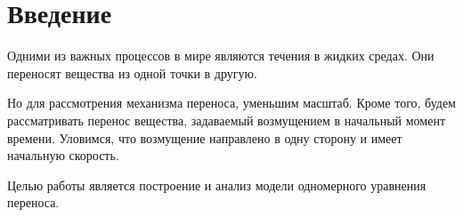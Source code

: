 \section{Введение}
Одними из важных процессов в мире являются течения в жидких средах. 
Они переносят вещества из одной точки в другую.

Но для рассмотрения механизма переноса, уменьшим масштаб.
Кроме того, будем рассматривать перенос вещества, задаваемый возмущением в начальный момент времени.
Уловимся, что возмущение направлено в одну сторону и имеет начальную скорость.

Целью работы является построение и анализ модели одномерного уравнения переноса.